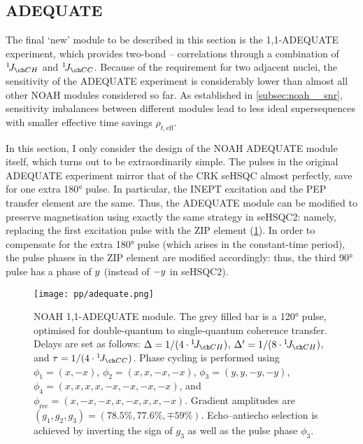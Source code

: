 \subsection{ADEQUATE}
\label{subsec:noah__adequate}

The final `new' module to be described in this section is the 1,1-ADEQUATE experiment\autocite{Reif1996JMRSA}, which provides two-bond -- correlations through a combination of $\oneJ{CH}$ and $\oneJ{CC}$.
Because of the requirement for two adjacent \carbon{} nuclei, the sensitivity of the ADEQUATE experiment is considerably lower than almost all other NOAH modules considered so far.
As established in \cref{subsec:noah__snr}, sensitivity imbalances between different modules lead to less ideal supersequences with smaller effective time savings $\rho_{t,\text{eff}}$.

In this section, I only consider the design of the NOAH ADEQUATE module itself, which turns out to be extraordinarily simple.
The \proton{} pulses in the original ADEQUATE experiment mirror that of the CRK seHSQC almost perfectly, save for one extra \ang{180} pulse.
In particular, the INEPT excitation and the PEP transfer element are the same.
Thus, the ADEQUATE module can be modified to preserve  magnetisation using exactly the same strategy in seHSQC2: namely, replacing the first \proton{} excitation pulse with the ZIP element (\cref{fig:adequate_noah}).
In order to compensate for the extra \ang{180} pulse (which arises in the constant-time period), the pulse phases in the ZIP element are modified accordingly: thus, the third \proton{} \ang{90} pulse has a phase of $y\/$ (instead of $-y\/$ in seHSQC2).

\begin{figure}[htb]
    \centering
    \texttt{[image: pp/adequate.png]}%
    \caption[NOAH 1,1-ADEQUATE module]{
        NOAH 1,1-ADEQUATE module.
        The grey filled bar is a \ang{120} pulse, optimised for \carbon{} double-quantum to single-quantum coherence transfer\autocite{Mareci1982JMR}.
        Delays are set as follows: $\Delta = 1 / (4 \cdot \oneJ{CH})$, $\Delta' = 1 / (8 \cdot \oneJ{CH})$, and $\tau = 1 / (4 \cdot \oneJ{CC})$.
        Phase cycling is performed using $\phi_1 = (x, -x)$, $\phi_2 = (x, x, -x, -x)$, $\phi_3 = (y, y, -y, -y)$, $\phi_4 = (x, x, x, x, -x, -x, -x, -x)$, and $\phi_\text{rec} = (x, -x, -x, x, -x, x, x, -x)$.
        Gradient amplitudes are $(g_1, g_2, g_3) = (78.5\%, 77.6\%, \mp 59\%)$.
        Echo--antiecho selection is achieved by inverting the sign of $g_3$ as well as the pulse phase $\phi_3$.
    }
    \label{fig:adequate_noah}
\end{figure}

